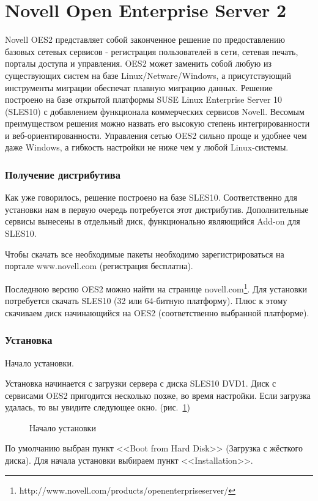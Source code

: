 \part{Novell Open Enterprise Server 2}
Novell OES2 представляет собой законченное решение по предоставлению базовых сетевых сервисов - регистрация пользователей в сети, сетевая печать, порталы доступа и управления. OES2 может заменить собой любую из существующих систем на базе Linux/Netware/Windows, а присутствующий инструменты миграции обеспечат плавную миграцию данных. Решение построено на базе открытой платформы SUSE Linux Enterprise Server 10 (SLES10) с добавлением функционала коммерческих сервисов Novell. Весомым преимуществом решения можно назвать его высокую степень интегрированности и веб-ориентированности. Управления сетью OES2 сильно проще и удобнее чем даже Windows, а гибкость настройки не ниже чем у любой Linux-системы.

\section{Получение дистрибутива}
Как уже говорилось, решение построено на базе SLES10. Соответственно для установки нам в первую очередь потребуется этот дистрибутив. Дополнительные сервисы вынесены в отдельный диск, функционально являющийся Add-on для SLES10.\par
Чтобы скачать все необходимые пакеты необходимо зарегистрироваться на портале www.novell.com (регистрация бесплатна).\par
Последнюю версию OES2 можно найти на странице novell.com\footnote{http://www.novell.com/products/openenterpriseserver/}. Для установки потребуется скачать SLES10 (32 или 64-битную платформу). Плюс к этому скачиваем диск начинающийся на OES2 (соответственно выбранной платформе).
\clearpage

\section{Установка}
Начало установки.\par
Установка начинается с загрузки сервера с диска SLES10 DVD1. Диск с сервисами OES2 пригодится несколько позже, во время настройки. Если загрузка удалась, то вы увидите следующее окно. (рис.~\ref{fig1})
\begin{figure}[H]
\caption{Начало установки}
\label{fig1}
\end{figure}
По умолчанию выбран пункт <<Boot from Hard Disk>> (Загрузка с жёсткого диска). Для начала установки выбираем пункт <<Installation>>.
\clearpage

